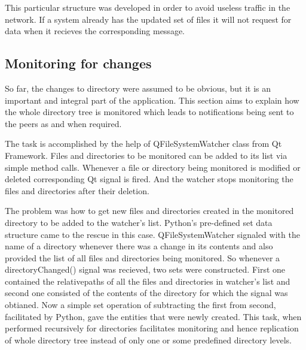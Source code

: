 This particular structure was developed in order to avoid useless traffic in the network. If a system already has the updated set of files it will not request for data when it recieves the corresponding message. 

\subsection{Monitoring for changes}
\label{subsec:monitoringChanges}
So far, the changes to directory were assumed to be obvious, but it is an important and integral part of the application. This section aims to explain how the whole directory tree is monitored which leads to notifications being sent to the peers as and when required.\par
The task is accomplished by the help of QFileSystemWatcher class from Qt Framework. Files and directories to be monitored can be added to its list via simple method calls. Whenever a file or directory being monitored is modified or deleted corresponding Qt signal is fired. And the watcher stops monitoring the files and directories after their deletion. \par
The problem was how to get new files and directories created in the monitored directory to be added to the watcher's list. Python's pre-defined set data structure came to the rescue in this case. QFileSystemWatcher signaled with the name of a directory whenever there was a change in its contents and also provided the list of all files and directories being monitored. So whenever a directoryChanged() signal was recieved, two sets were constructed. First one contained the relativepaths of all the files and directories in watcher's list and second one consisted of the contents of the directory for which the signal was obtianed. Now a simple set operation of subtracting the first from second, facilitated by Python, gave the entities that were newly created.
This task, when performed recursively for directories facilitates monitoring and hence replication of whole directory tree instead of only one or some predefined directory levels.
